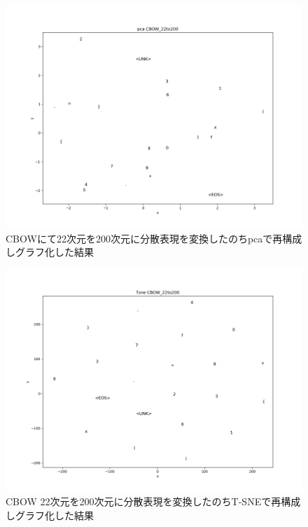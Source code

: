 \documentclass[a4j,11pt,report]{jsbook}
\begin{document}
\begin{center}
  \begin{figure}[H]
    \centering
    \includegraphics[width=0.8\linewidth]{image/CBOW_pca_out22_200.png}
    \caption{CBOWにて22次元を200次元に分散表現を変換したのちpcaで再構成しグラフ化した結果}
    \label{fig:89x2cbow_pac}
  \end{figure}
\end{center}


\begin{center}
  \begin{figure}[H]
    \centering
    \includegraphics[width=0.8\linewidth]{image/CBOW_tsne_out22_200.png}
    \caption{CBOW 22次元を200次元に分散表現を変換したのちT-SNEで再構成しグラフ化した結果}
    \label{fig:89x2cbow_tsne}
  \end{figure}
\end{center}
\end{document}
